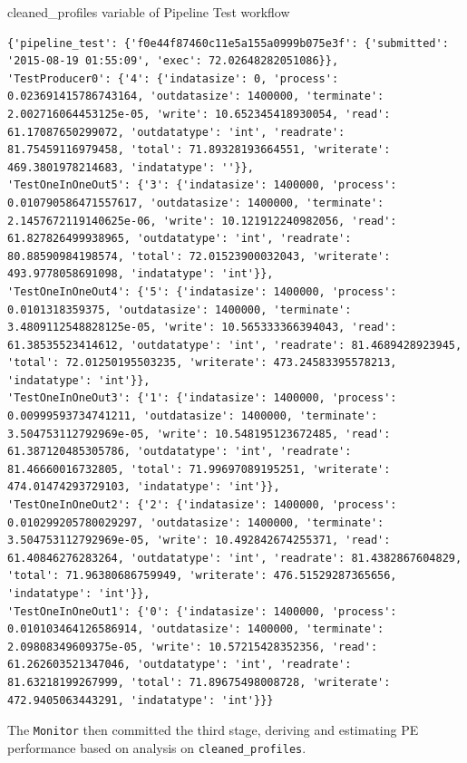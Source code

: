 \documentclass[10pt,twoside,openright,logo]{report}
\begin{document}
\begin{listing}
\caption{cleaned\_profiles variable of Pipeline Test workflow}
\label{code:pip-cleaned-profiles}
\begin{verbatim}
{'pipeline_test': {'f0e44f87460c11e5a155a0999b075e3f': {'submitted': '2015-08-19 01:55:09', 'exec': 72.02648282051086}},
'TestProducer0': {'4': {'indatasize': 0, 'process': 0.023691415786743164, 'outdatasize': 1400000, 'terminate': 2.002716064453125e-05, 'write': 10.652345418930054, 'read': 61.17087650299072, 'outdatatype': 'int', 'readrate': 81.75459116979458, 'total': 71.89328193664551, 'writerate': 469.3801978214683, 'indatatype': ''}},
'TestOneInOneOut5': {'3': {'indatasize': 1400000, 'process': 0.010790586471557617, 'outdatasize': 1400000, 'terminate': 2.1457672119140625e-06, 'write': 10.121912240982056, 'read': 61.827826499938965, 'outdatatype': 'int', 'readrate': 80.88590984198574, 'total': 72.01523900032043, 'writerate': 493.9778058691098, 'indatatype': 'int'}},
'TestOneInOneOut4': {'5': {'indatasize': 1400000, 'process': 0.0101318359375, 'outdatasize': 1400000, 'terminate': 3.4809112548828125e-05, 'write': 10.565333366394043, 'read': 61.38535523414612, 'outdatatype': 'int', 'readrate': 81.4689428923945, 'total': 72.01250195503235, 'writerate': 473.24583395578213, 'indatatype': 'int'}},
'TestOneInOneOut3': {'1': {'indatasize': 1400000, 'process': 0.00999593734741211, 'outdatasize': 1400000, 'terminate': 3.504753112792969e-05, 'write': 10.548195123672485, 'read': 61.387120485305786, 'outdatatype': 'int', 'readrate': 81.46660016732805, 'total': 71.99697089195251, 'writerate': 474.01474293729103, 'indatatype': 'int'}},
'TestOneInOneOut2': {'2': {'indatasize': 1400000, 'process': 0.010299205780029297, 'outdatasize': 1400000, 'terminate': 3.504753112792969e-05, 'write': 10.492842674255371, 'read': 61.40846276283264, 'outdatatype': 'int', 'readrate': 81.4382867604829, 'total': 71.96380686759949, 'writerate': 476.51529287365656, 'indatatype': 'int'}},
'TestOneInOneOut1': {'0': {'indatasize': 1400000, 'process': 0.010103464126586914, 'outdatasize': 1400000, 'terminate': 2.09808349609375e-05, 'write': 10.57215428352356, 'read': 61.262603521347046, 'outdatatype': 'int', 'readrate': 81.63218199267999, 'total': 71.89675498008728, 'writerate': 472.9405063443291, 'indatatype': 'int'}}}
\end{verbatim}
\end{listing}

The \texttt{Monitor} then committed the third stage, deriving and estimating PE performance based on analysis on \texttt{cleaned_profiles}.
\end{document}
